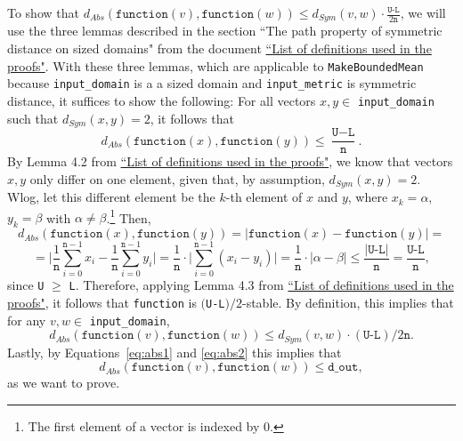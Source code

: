 \documentclass[11pt,a4paper]{article}
\theoremstyle{definition}
\newcommand{\dout}{\texttt{d\_out}}
\newcommand{\function}{\texttt{function}}
\newcommand{\silvia}[1]{{ {\color{blue}{(silvia)~#1}}}}
\begin{document}
To show that $d_{Abs}(\function(v), \function(w)) \leq d_{Sym}(v, w) \cdot \frac{\texttt{U-L}}{2\texttt{n}}$, we will use the three lemmas described in the section ``The path property of symmetric distance on sized domains" from the document \href{https://www.overleaf.com/project/60d214e390b337703d200982}{``List of definitions used in the proofs"}. With these three lemmas, which are applicable to \texttt{MakeBoundedMean} because \texttt{input\_domain} is a a sized domain and \texttt{input\_metric} is symmetric distance, it suffices to show the following: For all vectors $x, y \in$ \texttt{input\_domain} such that $d_{Sym}(x, y) = 2$, it follows that 
\[
d_{Abs}(\texttt{function}(x), \texttt{function}(y)) \leq \dfrac{\texttt{U} - \texttt{L}}{\texttt{n}}.
\]
By Lemma 4.2 from \href{https://www.overleaf.com/project/60d214e390b337703d200982}{``List of definitions used in the proofs"}, we know that vectors $x, y$ only differ on one element, given that, by assumption, $d_{Sym}(x, y) = 2$. Wlog, let this different element be the $k$-th element of $x$ and $y$, where $x_k = \alpha$, $y_k = \beta$ with $\alpha \neq \beta$.\footnote{The first element of a vector is indexed by 0.} Then,
\[
    d_{Abs}(\texttt{function}(x), \texttt{function}(y)) = |\texttt{function}(x) - \texttt{function}(y)| = 
\]
\[
    = \Big|\dfrac{1}{\texttt{n}}\sum_{i=0}^{\texttt{n}-1}x_i - \dfrac{1}{\texttt{n}}\sum_{i=0}^{\texttt{n}-1}y_i\Big| = \dfrac{1}{\texttt{n}} \cdot \Big| \sum_{i=0}^{\texttt{n}-1} (x_i - y_i) \Big| = \dfrac{1}{\texttt{n}}\cdot|\alpha - \beta| \leq \dfrac{|\texttt{U-L}|}{\texttt{n}} = \dfrac{\texttt{U-L}}{\texttt{n}},
\]
since \texttt{U} $\geq$ \texttt{L}. Therefore, applying Lemma 4.3 from \href{https://www.overleaf.com/project/60d214e390b337703d200982}{``List of definitions used in the proofs"}, it follows that \texttt{function} is $($\texttt{U-L}$)/2$-stable. By definition, this implies that for any $v, w \in$ \texttt{input\_domain},
\[
    d_{Abs}(\texttt{function}(v), \texttt{function}(w)) \leq d_{Sym}(v, w) \cdot (\texttt{U-L})/2\texttt{n}.
\]
Lastly, by Equations~\ref{eq:abs1} and \ref{eq:abs2} this implies that
\[
    d_{Abs}(\function(v), \function(w)) \leq \dout,
\]
as we want to prove.

\silvia{Flag: this will be updated to the more general notion of path property (through shortest path metric on a graph), but this matches the current version of the proofs document.}
\end{document}
